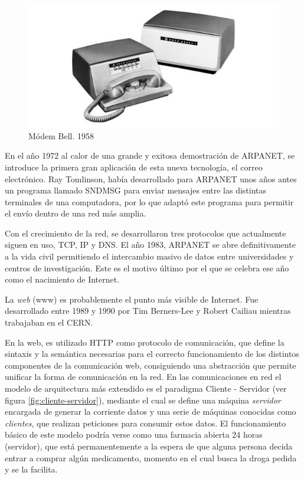 \begin{figure}[h!btp]
\centering
\includegraphics[scale=0.5, fbox={\fboxrule} 4mm]{images/03-antecedentes/09-modem_bell.jpg}
\caption{Módem Bell. 1958}
\label{fig:bell_modem}
\end{figure}

En el año 1972 al calor de una grande y exitosa demostración de \ac{ARPANET}, se introduce la primera gran aplicación de esta nueva tecnología, el correo electrónico. Ray Tomlinson, había desarrollado para \ac{ARPANET} unos años antes un programa llamado SNDMSG para enviar mensajes entre las distintas terminales de una computadora, por lo que adaptó este programa para permitir el envío dentro de una red más amplia.

Con el crecimiento de la red, se desarrollaron tres protocolos que actualmente siguen en uso, \ac{TCP}, \ac{IP} y \ac{DNS}. El año 1983, \ac{ARPANET} se abre definitivamente a la vida civil permitiendo el intercambio masivo de datos entre universidades y centros de investigación. Este es el motivo último por el que se celebra ese año como el nacimiento de Internet.

La \textit{web} (\ac{www}) es probablemente el punto más visible de Internet. Fue desarrollado entre 1989 y 1990 por Tim Berners-Lee y Robert Cailiau mientras trabajaban en el \ac{CERN}.

En la web, es utilizado \ac{HTTP} como protocolo de comunicación, que define la sintaxis y la semántica necesarias para el correcto funcionamiento de los distintos componentes de la comunicación web, consiguiendo una abstracción que permite unificar la forma de comunicación en la red. En las comunicaciones en red el modelo de arquitectura más extendido es el paradigma Cliente - Servidor (ver figura \ref{fig:cliente-servidor}), mediante el cual se define una máquina \textit{servidor} encargada de generar la corriente datos y una serie de máquinas conocidas como \textit{clientes}, que realizan peticiones para consumir estos datos. El funcionamiento básico de este modelo podría verse como una farmacia abierta 24 horas (servidor), que está permanentemente a la espera de que alguna persona decida entrar a comprar algún medicamento, momento en el cual busca la droga pedida y se la facilita.

